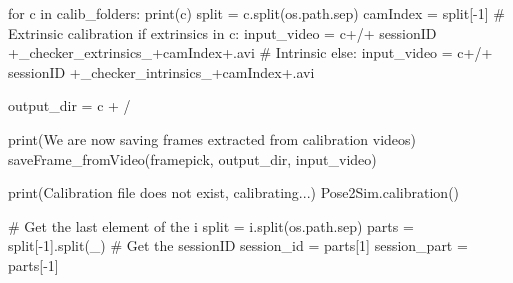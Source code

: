 \documentclass[
  letterpaper,
  DIV=11,
  numbers=noendperiod]{scrreprt}
\newenvironment{Shaded}{\begin{snugshade}}{\end{snugshade}}
\newcommand{\BuiltInTok}[1]{\textcolor[rgb]{0.00,0.23,0.31}{#1}}
\newcommand{\CommentTok}[1]{\textcolor[rgb]{0.37,0.37,0.37}{#1}}
\newcommand{\ControlFlowTok}[1]{\textcolor[rgb]{0.00,0.23,0.31}{#1}}
\newcommand{\DecValTok}[1]{\textcolor[rgb]{0.68,0.00,0.00}{#1}}
\newcommand{\KeywordTok}[1]{\textcolor[rgb]{0.00,0.23,0.31}{#1}}
\newcommand{\NormalTok}[1]{\textcolor[rgb]{0.00,0.23,0.31}{#1}}
\newcommand{\OperatorTok}[1]{\textcolor[rgb]{0.37,0.37,0.37}{#1}}
\newcommand{\StringTok}[1]{\textcolor[rgb]{0.13,0.47,0.30}{#1}}
\begin{document}
\begin{Shaded}
\begin{Highlighting}[]
        \ControlFlowTok{for}\NormalTok{ c }\KeywordTok{in}\NormalTok{ calib\_folders:}
            \BuiltInTok{print}\NormalTok{(c)}
\NormalTok{            split }\OperatorTok{=}\NormalTok{ c.split(os.path.sep)}
\NormalTok{            camIndex }\OperatorTok{=}\NormalTok{ split[}\OperatorTok{{-}}\DecValTok{1}\NormalTok{]}
            \CommentTok{\# Extrinsic calibration}
            \ControlFlowTok{if} \StringTok{\textquotesingle{}extrinsics\textquotesingle{}} \KeywordTok{in}\NormalTok{ c:}
\NormalTok{                input\_video }\OperatorTok{=}\NormalTok{ c}\OperatorTok{+}\StringTok{\textquotesingle{}/\textquotesingle{}}\OperatorTok{+}\NormalTok{ sessionID }\OperatorTok{+}\StringTok{\textquotesingle{}\_checker\_extrinsics\_\textquotesingle{}}\OperatorTok{+}\NormalTok{camIndex}\OperatorTok{+}\StringTok{\textquotesingle{}.avi\textquotesingle{}} 
            \CommentTok{\# Intrinsic}
            \ControlFlowTok{else}\NormalTok{:}
\NormalTok{                input\_video }\OperatorTok{=}\NormalTok{ c}\OperatorTok{+}\StringTok{\textquotesingle{}/\textquotesingle{}}\OperatorTok{+}\NormalTok{ sessionID }\OperatorTok{+}\StringTok{\textquotesingle{}\_checker\_intrinsics\_\textquotesingle{}}\OperatorTok{+}\NormalTok{camIndex}\OperatorTok{+}\StringTok{\textquotesingle{}.avi\textquotesingle{}}

\NormalTok{            output\_dir }\OperatorTok{=}\NormalTok{ c }\OperatorTok{+} \StringTok{\textquotesingle{}/\textquotesingle{}}
            
            \BuiltInTok{print}\NormalTok{(}\StringTok{\textquotesingle{}We are now saving frames extracted from calibration videos\textquotesingle{}}\NormalTok{)}
\NormalTok{            saveFrame\_fromVideo(framepick, output\_dir, input\_video)}
    
        \BuiltInTok{print}\NormalTok{(}\StringTok{\textquotesingle{}Calibration file does not exist, calibrating...\textquotesingle{}}\NormalTok{)}
\NormalTok{        Pose2Sim.calibration() }

        \CommentTok{\# Get the last element of the i}
\NormalTok{        split }\OperatorTok{=}\NormalTok{ i.split(os.path.sep)}
\NormalTok{        parts }\OperatorTok{=}\NormalTok{ split[}\OperatorTok{{-}}\DecValTok{1}\NormalTok{].split(}\StringTok{\textquotesingle{}\_\textquotesingle{}}\NormalTok{)}
        \CommentTok{\# Get the sessionID}
\NormalTok{        session\_id }\OperatorTok{=}\NormalTok{ parts[}\DecValTok{1}\NormalTok{]}
\NormalTok{        session\_part }\OperatorTok{=}\NormalTok{ parts[}\OperatorTok{{-}}\DecValTok{1}\NormalTok{]}


\end{Highlighting}
\end{Shaded}
\end{document}
